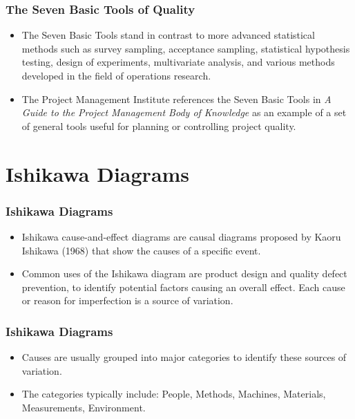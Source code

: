 \documentclass{beamer}
\begin{document}
\begin{frame}
\frametitle{The Seven Basic Tools of Quality}
\Large
\begin{itemize}
\item The Seven Basic Tools stand in contrast to more advanced statistical methods such as survey sampling, acceptance sampling, statistical hypothesis testing, design of experiments, multivariate analysis, and various methods developed in the field of operations research.
\item The Project Management Institute references the Seven Basic Tools in \textit{A Guide to 
the Project Management Body of Knowledge} as an example of a set of general tools useful 
for planning or controlling project quality.
\end{itemize}
\end{frame}
\section{Ishikawa Diagrams}
\begin{frame}
\frametitle{Ishikawa Diagrams}
\Large
\begin{itemize}
\item Ishikawa cause-and-effect diagrams are causal diagrams proposed by Kaoru Ishikawa (1968) 
that show the causes of a specific event.
\item Common uses of the Ishikawa diagram are product design and quality defect 
prevention, to identify potential factors causing an overall effect. Each cause or reason for imperfection is a source of variation. 
\end{itemize}
\end{frame}
\begin{frame}
\frametitle{Ishikawa Diagrams}
\Large
\begin{itemize}
\item Causes are usually grouped into major categories to identify these sources of 
variation. 
\item The categories typically include: People, Methods, Machines, Materials, Measurements, Environment.
\end{itemize}
\end{frame}
\end{document}
